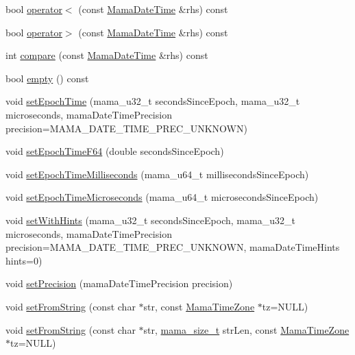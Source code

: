 \begin{DoxyCompactItemize}
bool \hyperlink{classWombat_1_1MamaDateTime_a4d3504dac7104377f71e9b1cce308688}{operator$<$} (const \hyperlink{classWombat_1_1MamaDateTime}{MamaDateTime} \&rhs) const 
\item 
bool \hyperlink{classWombat_1_1MamaDateTime_a53b4e2adb4c5c97a9b0fde3199848694}{operator$>$} (const \hyperlink{classWombat_1_1MamaDateTime}{MamaDateTime} \&rhs) const 
\item 
int \hyperlink{classWombat_1_1MamaDateTime_a3b3685ec4ce83d445a4dd3c50719ea19}{compare} (const \hyperlink{classWombat_1_1MamaDateTime}{MamaDateTime} \&rhs) const 
\item 
bool \hyperlink{classWombat_1_1MamaDateTime_adaf5774adbf80a17c7e5da8850b7af08}{empty} () const 
\item 
void \hyperlink{classWombat_1_1MamaDateTime_a11526c02ff3b37ce8e6678d176219cc8}{setEpochTime} (mama\_\-u32\_\-t secondsSinceEpoch, mama\_\-u32\_\-t microseconds, mamaDateTimePrecision precision=MAMA\_\-DATE\_\-TIME\_\-PREC\_\-UNKNOWN)
\item 
void \hyperlink{classWombat_1_1MamaDateTime_a1bdc0da59f4470e4ee69f21f177fb23b}{setEpochTimeF64} (double secondsSinceEpoch)
\item 
void \hyperlink{classWombat_1_1MamaDateTime_aaea9d4b7234ccdc8c7e56580e4802a48}{setEpochTimeMilliseconds} (mama\_\-u64\_\-t millisecondsSinceEpoch)
\item 
void \hyperlink{classWombat_1_1MamaDateTime_a1e0773b5b60e6786921cfa8c7e6f6403}{setEpochTimeMicroseconds} (mama\_\-u64\_\-t microsecondsSinceEpoch)
\item 
void \hyperlink{classWombat_1_1MamaDateTime_a1a4e876163aae99f96fa98162424895b}{setWithHints} (mama\_\-u32\_\-t secondsSinceEpoch, mama\_\-u32\_\-t microseconds, mamaDateTimePrecision precision=MAMA\_\-DATE\_\-TIME\_\-PREC\_\-UNKNOWN, mamaDateTimeHints hints=0)
\item 
void \hyperlink{classWombat_1_1MamaDateTime_a5da515d920a7999066e8af43eff427ee}{setPrecision} (mamaDateTimePrecision precision)
\item 
void \hyperlink{classWombat_1_1MamaDateTime_a403d86b47924626e1674ebdd9e8d9bb2}{setFromString} (const char $\ast$str, const \hyperlink{classWombat_1_1MamaTimeZone}{MamaTimeZone} $\ast$tz=NULL)
\item 
void \hyperlink{classWombat_1_1MamaDateTime_ab8b0370e32d78691526cb620bfc6971d}{setFromString} (const char $\ast$str, \hyperlink{classmama__size__t}{mama\_\-size\_\-t} strLen, const \hyperlink{classWombat_1_1MamaTimeZone}{MamaTimeZone} $\ast$tz=NULL)
\item 

\end{DoxyCompactItemize}
